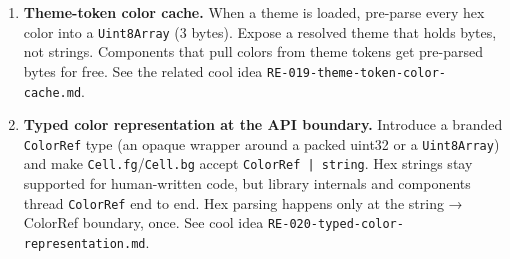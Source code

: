 \begin{enumerate}
\def\labelenumi{\arabic{enumi}.}
\item
  \textbf{Theme-token color cache.} When a theme is loaded, pre-parse every hex color into a \texttt{U\allowbreak{}i\allowbreak{}n\allowbreak{}t\allowbreak{}8\allowbreak{}A\allowbreak{}r\allowbreak{}r\allowbreak{}a\allowbreak{}y} (3 bytes). Expose a resolved theme that holds bytes, not strings. Components that pull colors from theme tokens get pre-parsed bytes for free. See the related cool idea \texttt{R\allowbreak{}E\allowbreak{}-\allowbreak{}0\allowbreak{}1\allowbreak{}9\allowbreak{}-\allowbreak{}t\allowbreak{}h\allowbreak{}e\allowbreak{}m\allowbreak{}e\allowbreak{}-\allowbreak{}t\allowbreak{}o\allowbreak{}k\allowbreak{}e\allowbreak{}n\allowbreak{}-\allowbreak{}c\allowbreak{}o\allowbreak{}l\allowbreak{}o\allowbreak{}r\allowbreak{}-\allowbreak{}c\allowbreak{}a\allowbreak{}c\allowbreak{}h\allowbreak{}e\allowbreak{}.\allowbreak{}m\allowbreak{}d}.
\item
  \textbf{Typed color representation at the API boundary.} Introduce a branded \texttt{C\allowbreak{}o\allowbreak{}l\allowbreak{}o\allowbreak{}r\allowbreak{}R\allowbreak{}e\allowbreak{}f} type (an opaque wrapper around a packed uint32 or a \texttt{U\allowbreak{}i\allowbreak{}n\allowbreak{}t\allowbreak{}8\allowbreak{}A\allowbreak{}r\allowbreak{}r\allowbreak{}a\allowbreak{}y}) and make \texttt{C\allowbreak{}e\allowbreak{}l\allowbreak{}l\allowbreak{}.\allowbreak{}f\allowbreak{}g}/\texttt{C\allowbreak{}e\allowbreak{}l\allowbreak{}l\allowbreak{}.\allowbreak{}b\allowbreak{}g} accept \texttt{C\allowbreak{}o\allowbreak{}l\allowbreak{}o\allowbreak{}r\allowbreak{}R\allowbreak{}e\allowbreak{}f\allowbreak{} \allowbreak{}|\allowbreak{} \allowbreak{}s\allowbreak{}t\allowbreak{}r\allowbreak{}i\allowbreak{}n\allowbreak{}g}. Hex strings stay supported for human-written code, but library internals and components thread \texttt{C\allowbreak{}o\allowbreak{}l\allowbreak{}o\allowbreak{}r\allowbreak{}R\allowbreak{}e\allowbreak{}f} end to end. Hex parsing happens only at the string → ColorRef boundary, once. See cool idea \texttt{R\allowbreak{}E\allowbreak{}-\allowbreak{}0\allowbreak{}2\allowbreak{}0\allowbreak{}-\allowbreak{}t\allowbreak{}y\allowbreak{}p\allowbreak{}e\allowbreak{}d\allowbreak{}-\allowbreak{}c\allowbreak{}o\allowbreak{}l\allowbreak{}o\allowbreak{}r\allowbreak{}-\allowbreak{}r\allowbreak{}e\allowbreak{}p\allowbreak{}r\allowbreak{}e\allowbreak{}s\allowbreak{}e\allowbreak{}n\allowbreak{}t\allowbreak{}a\allowbreak{}t\allowbreak{}i\allowbreak{}o\allowbreak{}n\allowbreak{}.\allowbreak{}m\allowbreak{}d}.
\end{enumerate}

